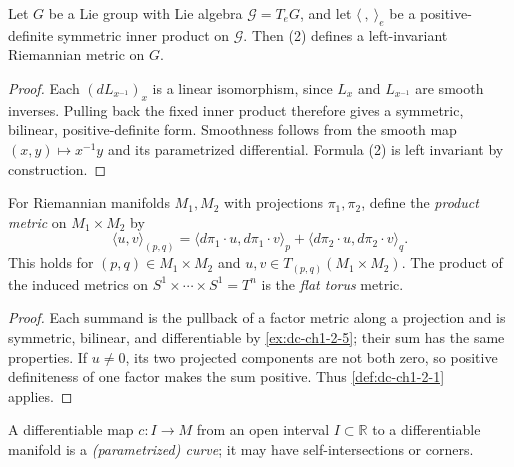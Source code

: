 \begin{proposition}
  \label{prop:dc-ch1-2-6-leftinv}
  \leanok
  Let $G$ be a Lie group with Lie algebra $\mathcal{G}=T_eG$, and let
  $\langle\ ,\ \rangle_e$ be a positive-definite symmetric inner product on
  $\mathcal{G}$. Then (2) defines a left-invariant Riemannian metric on $G$.
\end{proposition}
\begin{proof}
  \leanok
  \sketch
  Each $(dL_{x^{-1}})_x$ is a linear isomorphism, since $L_x$ and $L_{x^{-1}}$
  are smooth inverses. Pulling back the fixed inner product therefore gives a
  symmetric, bilinear, positive-definite form. Smoothness follows from the smooth
  map $(x,y)\mapsto x^{-1}y$ and its parametrized differential. Formula (2) is
  left invariant by construction.
\end{proof}

\begin{example}
  \label{ex:dc-ch1-2-7}
  \leanok
  For Riemannian manifolds $M_1,M_2$ with projections $\pi_1,\pi_2$, define
  the \emph{product metric} on $M_1\times M_2$ by
  $$
  \langle u,v\rangle_{(p,q)}=
  \langle d\pi_1\cdot u,d\pi_1\cdot v\rangle_p+
  \langle d\pi_2\cdot u,d\pi_2\cdot v\rangle_q.
  $$
  This holds for $(p,q)\in M_1\times M_2$ and
  $u,v\in T_{(p,q)}(M_1\times M_2)$.
  The product of the induced metrics on $S^1\times\cdots\times S^1=T^n$ is the
  \emph{flat torus} metric.
\end{example}
\begin{proof}
  \leanok
  \sketch
  Each summand is the pullback of a factor metric along a projection and is
  symmetric, bilinear, and differentiable by \cref{ex:dc-ch1-2-5}; their sum has
  the same properties. If $u\ne0$, its two projected components are not both zero,
  so positive definiteness of one factor makes the sum positive. Thus
  \cref{def:dc-ch1-2-1} applies.
\end{proof}

\begin{definition}
  \label{def:dc-ch1-2-8}
  \leanok
  A differentiable map $c:I\to M$ from an open interval $I\subset\mathbb{R}$ to
  a differentiable manifold is a \emph{(parametrized) curve}; it may have
  self-intersections or corners.
\end{definition}


